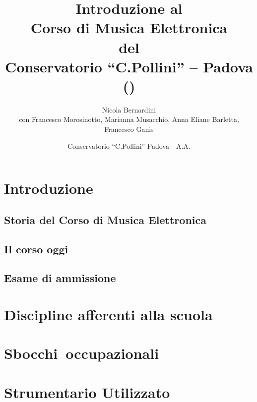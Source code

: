 \documentclass[\printmode,compress,xcolor=dvipsnames]{beamer}
\title[SME Intro \gitAbbrevHash]
{\small%
  Introduzione al\\
  Corso di Musica Elettronica\\
  del\\
  Conservatorio ``C.Pollini'' -- Padova\\
	{\tiny (\rcstag)}
}
\author{%
  {\small Nicola Bernardini\\{\tiny con Francesco Morosinotto, Marianna
  Musacchio, Anna Eliane Barletta, Francesco Ganis}}\\
	{\tiny \href{mailto:\cpholderemail}{\cpholderemail}}
}
\date[Padova \AnnoAccademico]{Conservatorio ``C.Pollini'' Padova - A.A. \AnnoAccademico}
\begin{document}
  

\begin{frame}
	\titlepage
\end{frame}
  
\section{Introduzione}

\subsection[La\ Storia]{Storia del Corso di Musica Elettronica}

\subsection[Oggi]{Il corso oggi}

\subsection[Ammissioni]{Esame di ammissione}


\section[Discipline]{Discipline afferenti alla scuola}


\section{Sbocchi\ occupazionali}



\section[Strumentario]{Strumentario Utilizzato}

\end{document}
